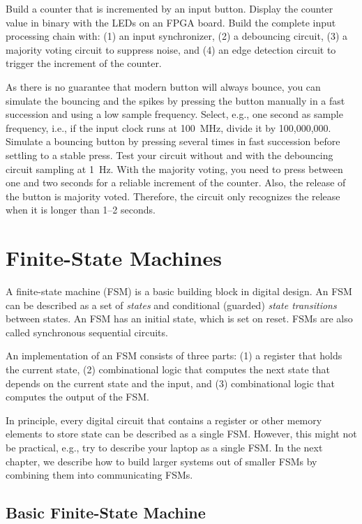 \documentclass[%
    10pt,
    headinclude, footexclude,
    openright, %
    notitlepage,
    cleardoubleempty,
    headsepline,
    pointlessnumbers,
    bibtotoc, idxtotoc,
    ]{scrbook}
\begin{document}
Build a counter that is incremented by an input button.
Display the counter value in binary with the LEDs on an FPGA board.
Build the complete input processing chain with: (1) an input synchronizer,
(2) a debouncing circuit, (3) a majority voting circuit to suppress noise,
and (4) an edge detection circuit to trigger the increment of the counter.

As there is no guarantee that modern button will always bounce, you can
simulate the bouncing and the spikes by pressing the button manually in a fast succession
and using a low sample frequency. Select, e.g., one second as sample frequency,
i.e., if the input clock runs at 100~MHz, divide it by 100,000,000.
Simulate a bouncing button by pressing several times in fast succession
before settling to a stable press. Test your circuit without and with the
debouncing circuit sampling at 1~Hz.
With the majority voting, you need to press between one and two seconds
for a reliable increment of the counter. Also, the release of the button is
majority voted. Therefore, the circuit only recognizes the release when it is
longer than 1--2 seconds.

\chapter{Finite-State Machines}

A finite-state machine (FSM) is a basic building block in digital design.
An FSM can be described as a set of \emph{states} and conditional (guarded)
\emph{state transitions} between states. 
An FSM has an initial state, which is set on reset.
FSMs are also called synchronous sequential circuits.

An implementation of an FSM consists of three parts: (1) a register that holds the current state,
(2) combinational logic that computes the next state that depends on the current
state and the input, and (3) combinational logic that computes the output of the FSM.

In principle, every digital circuit that contains a register or other memory elements
to store state can be described as a single FSM. However, this might
not be practical, e.g., try to describe your laptop as a single FSM.
In the next chapter, we describe how to build larger systems
out of smaller FSMs by combining them into communicating FSMs.

\section{Basic Finite-State Machine}
\end{document}
